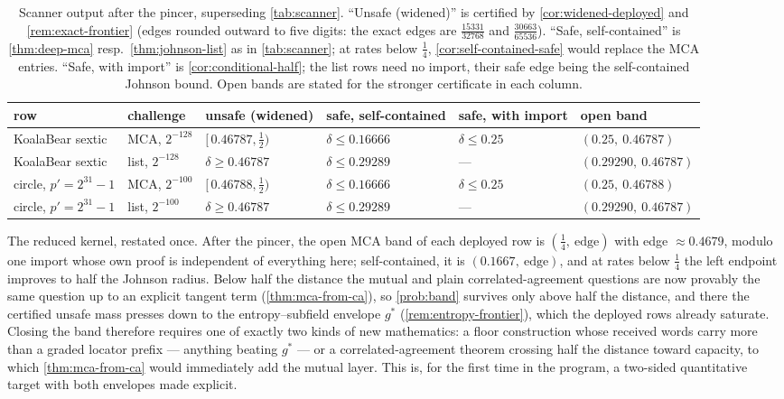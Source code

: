 \documentclass[11pt]{article}
\theoremstyle{definition}
\theoremstyle{remark}
\begin{document}
\begin{table}[t]
\centering\footnotesize
\setlength{\tabcolsep}{4pt}
\begin{tabular}{@{}llllll@{}}
\toprule
row & challenge & unsafe \textup{(widened)} & safe, self-contained & safe, with import & open band \\
\midrule
KoalaBear sextic & MCA, $2^{-128}$ & $[\,0.46787,\tfrac12)$ & $\delta\le0.16666$ & $\delta\le0.25$ & $(0.25,\ 0.46787)$ \\
KoalaBear sextic & list, $2^{-128}$ & $\delta\ge0.46787$ & $\delta\le0.29289$ & --- & $(0.29290,\ 0.46787)$ \\
circle, $p'{=}2^{31}{-}1$ & MCA, $2^{-100}$ & $[\,0.46788,\tfrac12)$ & $\delta\le0.16666$ & $\delta\le0.25$ & $(0.25,\ 0.46788)$ \\
circle, $p'{=}2^{31}{-}1$ & list, $2^{-100}$ & $\delta\ge0.46787$ & $\delta\le0.29289$ & --- & $(0.29290,\ 0.46787)$ \\
\bottomrule
\end{tabular}
\caption{Scanner output after the pincer, superseding \cref{tab:scanner}. ``Unsafe (widened)'' is certified by \cref{cor:widened-deployed} and \cref{rem:exact-frontier} (edges rounded outward to five digits: the exact edges are $\tfrac{15331}{32768}$ and $\tfrac{30663}{65536}$). ``Safe, self-contained'' is \cref{thm:deep-mca} resp.\ \cref{thm:johnson-list} as in \cref{tab:scanner}; at rates below $\tfrac14$, \cref{cor:self-contained-safe} would replace the MCA entries. ``Safe, with import'' is \cref{cor:conditional-half}; the list rows need no import, their safe edge being the self-contained Johnson bound. Open bands are stated for the stronger certificate in each column.}
\label{tab:scanner2}
\end{table}

The reduced kernel, restated once. After the pincer, the open MCA band of each deployed row is $(\tfrac14,\ \text{edge})$ with edge $\approx0.4679$, modulo one import whose own proof is independent of everything here; self-contained, it is $(0.1667,\ \text{edge})$, and at rates below $\tfrac14$ the left endpoint improves to half the Johnson radius. Below half the distance the mutual and plain correlated-agreement questions are now provably the same question up to an explicit tangent term (\cref{thm:mca-from-ca}), so \cref{prob:band} survives only above half the distance, and there the certified unsafe mass presses down to the entropy--subfield envelope $g^*$ (\cref{rem:entropy-frontier}), which the deployed rows already saturate. Closing the band therefore requires one of exactly two kinds of new mathematics: a floor construction whose received words carry more than a graded locator prefix --- anything beating $g^*$ --- or a correlated-agreement theorem crossing half the distance toward capacity, to which \cref{thm:mca-from-ca} would immediately add the mutual layer. This is, for the first time in the program, a two-sided quantitative target with both envelopes made explicit.
\end{document}
